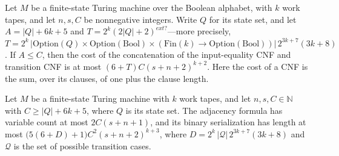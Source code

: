 \begin{theorem}
\label{Complexity.codecAdjacency_cost}
\leanok
{}
Let $M$ be a finite-state Turing machine over the Boolean alphabet, with $k$ work tapes,
and let $n,s,C$ be nonnegative integers. Write $Q$ for its state set, and let
$A=|Q|+6k+5$ and $T=2^k(2|Q|+2)^{	ext{?}}$—more precisely,
$T=2^k\,|\mathrm{Option}(Q)\times\mathrm{Option}(\mathrm{Bool})\times(\mathrm{Fin}(k)\to\mathrm{Option}(\mathrm{Bool}))|\,2^{3k+7}(3k+8)$.
If $A\le C$, then the cost of the concatenation of the input-equality CNF and transition
CNF is at most $(6+T)C(s+n+2)^{k+2}$. Here the cost of a CNF is the sum, over its
clauses, of one plus the clause length.
\end{theorem}

\begin{theorem}
\label{Complexity.configurationAdjacency_bounds}
\leanok
{}
Let $M$ be a finite-state Turing machine with $k$ work tapes, and let $n,s,C\in\mathbb
N$ with $C\ge |Q|+6k+5$, where $Q$ is its state set. The adjacency formula has variable
count at most $2C(s+n+1)$, and its binary serialization has length at most
$\bigl(5(6+D)+1\bigr)C^2(s+n+2)^{k+3}$, where $D=2^k\,|\mathcal Q|\,2^{3k+7}(3k+8)$ and
$\mathcal Q$ is the set of possible transition cases.
\end{theorem}


